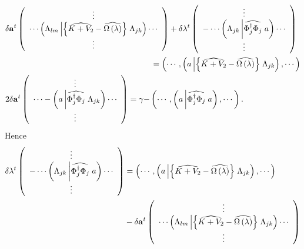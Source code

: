 \documentclass[aps,preprint]{revtex4}%
\begin{document}
\begin{align}
&  \delta\mathbf{a}^{t}\left(
\begin{array}
[c]{c}%
\vdots\\
\cdots\left(  \Lambda_{lm}\left\vert \left\{  \widehat{K+V_{2}}%
-\widehat{\Omega\left(  \lambda\right)  }\right\}  \right.  \Lambda
_{jk}\right)  \cdots\\
\vdots
\end{array}
\right)  +\delta\mathbf{\lambda}^{t}\left(
\begin{array}
[c]{c}%
\vdots\\
-\cdots\left(  \Lambda_{jk}\left\vert \widehat{\Phi_{j}^{\dagger}\Phi_{j}%
}\right.  a\right)  \cdots\\
\vdots
\end{array}
\right) \nonumber\\
&  \qquad\qquad\qquad\qquad\qquad\qquad\qquad\qquad\qquad\left.  =\right.
\left(  \cdots,\left(  a\left\vert \left\{  \widehat{K+V_{2}}-\widehat{\Omega
\left(  \lambda\right)  }\right\}  \right.  \Lambda_{jk}\right)
,\cdots\right) \nonumber\\
&  2\delta\mathbf{a}^{t}\left(
\begin{array}
[c]{c}%
\vdots\\
\cdots-\left(  a\left\vert \widehat{\Phi_{j}^{\dagger}\Phi_{j}}\right.
\Lambda_{jk}\right)  \cdots\\
\vdots
\end{array}
\right)  =\mathbf{\gamma-}\left(  \cdots,\left(  a\left\vert \widehat{\Phi
_{j}^{\dagger}\Phi_{j}}\right.  a\right)  ,\cdots\right)  \mathbf{.}%
\end{align}
Hence
\begin{align}
\delta\mathbf{\lambda}^{t}\left(
\begin{array}
[c]{c}%
\vdots\\
-\cdots\left(  \Lambda_{jk}\left\vert \widehat{\Phi_{j}^{\dagger}\Phi_{j}%
}\right.  a\right)  \cdots\\
\vdots
\end{array}
\right)   &  =\left(  \cdots,\left(  a\left\vert \left\{  \widehat{K+V_{2}%
}-\widehat{\Omega\left(  \lambda\right)  }\right\}  \right.  \Lambda
_{jk}\right)  ,\cdots\right) \nonumber\\
&  -\delta\mathbf{a}^{t}\left(
\begin{array}
[c]{c}%
\vdots\\
\cdots\left(  \Lambda_{lm}\left\vert \left\{  \widehat{K+V_{2}}%
-\widehat{\Omega\left(  \lambda\right)  }\right\}  \right.  \Lambda
_{jk}\right)  \cdots\\
\vdots
\end{array}
\right)
\end{align}
\end{document}
